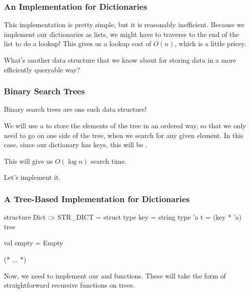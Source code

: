 \documentclass[aspectratio=169]{beamer}
\begin{document}
\begin{frame}[fragile]
  \frametitle{An Implementation for Dictionaries}

  This implementation is pretty simple, but it is reasonably
  inefficient. Because we implement our dictionaries as lists,
  we might have to traverse to the end of the list to do a 
  lookup! This gives us a lookup cost of $O(n)$, which is a 
  little pricey.
  
  What's another data structure that we know about for storing
  data in a more efficiently queryable way?
\end{frame}

\begin{frame}[fragile]
  \frametitle{Binary Search Trees}

  Binary search trees are one such data structure!

  We will use a  to store the elements
  of the tree in an ordered way, so that we only need to go on
  one side of the tree, when we search for any given element. In
  this case, since our dictionary has  keys, this
  will be .
  
  This will give us $O(\log n)$ search time.

  Let's implement it.
\end{frame}

\begin{frame}[fragile]
  \frametitle{A Tree-Based Implementation for Dictionaries}

  \begin{codeblock}
    structure Dict :> STR_DICT =
      struct 
        type key = string
        type 'a t = (key * 'a) tree 

        val empty = Empty
       
        (* ... *)
  \end{codeblock}

  Now, we need to implement our  and  functions.
  These will take the form of straightforward recursive functions on trees.

\end{frame}
\end{document}
